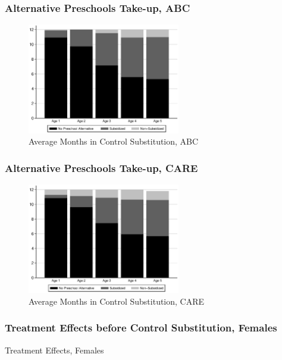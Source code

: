 \documentclass[static]{JJH-Beamer}
\begin{document}

\begin{frame}
\frametitle{Alternative Preschools Take-up, ABC}\label{abc_subsidized}
\begin{figure}
\caption{Average Months in Control Substitution, ABC}
	\includegraphics[width=18em]{output/blackwhite_CCnumber}
\end{figure}
\hyperlink{substitution}{}
\end{frame}


\begin{frame}
\frametitle{Alternative Preschools Take-up, CARE}\label{care_subsidized}
\begin{figure}
\caption{Average Months in Control Substitution, CARE}
	\includegraphics[width=18em]{output/blackwhite_CCnumber_care}
\end{figure}
\hyperlink{substitution}{}
\end{frame}


\begin{frame}
\frametitle{Treatment Effects before Control Substitution, Females}
\begin{center}
\begin{table}
	\caption{Treatment Effects, Females} \label{tab:onsetsfemales}
	\scalebox{.60}{}
\end{table}
\end{center}
\end{frame}
\end{document}

